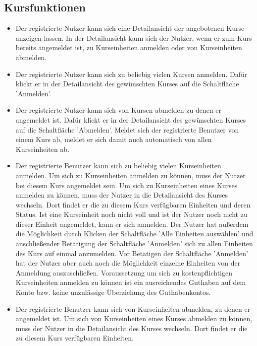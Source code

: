 \documentclass[a4paper]{scrreprt}
\begin{document}
		\subsection{Kursfunktionen}
			\begin{itemize}
				\item {}
					Der registrierte Nutzer kann sich eine Detailansicht der angebotenen Kurse anzeigen lassen. In der Detailansicht kann sich der Nutzer, wenn er zum Kurs bereits angemeldet ist, zu Kurseinheiten anmelden oder von Kurseinheiten abmelden.
				\item {} 
					Der registrierte Nutzer kann sich zu beliebig vielen Kursen anmelden. 
					Dafür klickt er in der Detailansicht des gewünschten Kurses auf die Schaltfläche 'Anmelden'.	\item {} 
					Der registrierte Nutzer kann sich von Kursen abmelden zu denen er angemeldet ist. Dafür klickt er in der Detailansicht des gewünschten Kurses auf die Schaltfläche 'Abmelden'. Meldet sich der registrierte Benutzer von einem Kurs ab, meldet er sich damit auch automatisch von allen Kurseinheiten ab.
				\item {}
					Der registrierte Benutzer kann sich zu beliebig vielen Kurseinheiten anmelden. Um sich zu Kurseinheiten anmelden zu können, muss der Nutzer bei diesem Kurs angemeldet sein.
					Um sich zu Kurseinheiten eines Kurses anmelden zu können, muss der Nutzer in die Detailansicht des Kurses wechseln. Dort findet er die zu diesem Kurs verfügbaren Einheiten und deren Status. Ist eine Kurseinheit noch nicht voll und ist der Nutzer noch nicht zu dieser Einheit angemeldet, kann er sich anmelden. Der Nutzer hat außerdem die Möglichkeit durch Klicken der Schaltfläche 'Alle Einheiten auswählen' und anschließender Betätigung der Schaltfläche 'Anmelden' sich zu allen Einheiten des Kurs auf einmal anzumelden. Vor Betätigen der Schaltfläche 'Anmelden' hat der Nutzer aber auch noch die Möglichkeit einzelne Einheiten von der Anmeldung auszuschließen. Voraussetzung um sich zu kostenpflichtigen Kurseinheiten anmelden zu können ist ein ausreichendes Guthaben auf dem Konto bzw. keine unzulässige Überziehung des Guthabenkontos.
				\item {}
					Der registrierte Benutzer kann sich von Kurseinheiten abmelden, zu denen er angemeldet ist. Um sich von Kurseinheiten eines Kurses abmelden zu können, muss der Nutzer in die Detailansicht des Kurses wechseln. Dort findet er die zu diesem Kurs verfügbaren Einheiten.

\end{itemize}
\end{document}
